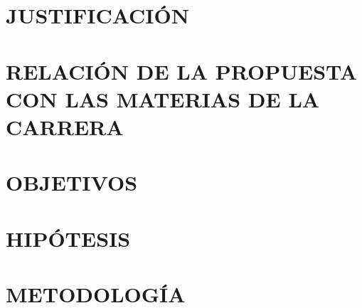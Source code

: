 \documentclass[12pt]{report}
\begin{document}
	
	
	
	
	\chapter{JUSTIFICACIÓN}
	
	
	
	\chapter{RELACIÓN DE LA PROPUESTA CON LAS MATERIAS DE LA CARRERA}
	
	
	
	\chapter{OBJETIVOS}
	
	
	
	\chapter{HIPÓTESIS}
	
	
	
	
	\chapter{METODOLOGÍA}
	
	
	
\end{document}
